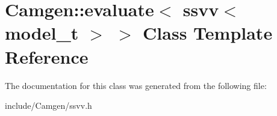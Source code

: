 \hypertarget{a00199}{}\section{Camgen\+:\+:evaluate$<$ ssvv$<$ model\+\_\+t $>$ $>$ Class Template Reference}
\label{a00199}


The documentation for this class was generated from the following file\+:\begin{DoxyCompactItemize}
\item 
include/\+Camgen/ssvv.\+h\end{DoxyCompactItemize}
